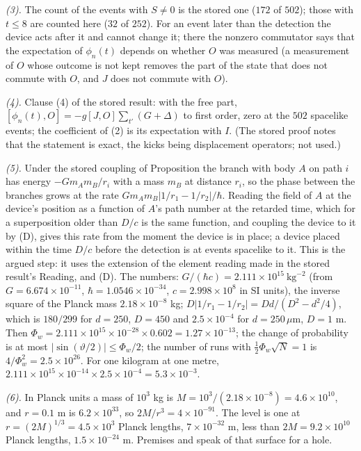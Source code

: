 \emph{(3).} The count of the events with $S \neq 0$ is the stored one ($172$ of $502$); those with $t \le 8$ are counted here ($32$ of $252$). For an event later than the detection the device acts after it and cannot change it; there the nonzero commutator says that the expectation of $\phi_{n}(t)$ depends on whether $O$ was measured (a measurement of $O$ whose outcome is not kept removes the part of the state that does not commute with $O$, and $J$ does not commute with $O$).

\emph{(4).} Clause (4) of the stored result: with the free part, $[\phi_{n}(t), O] = -g[J, O]\sum_{t'}(G + \Delta)$ to first order, zero at the $502$ spacelike events; the coefficient of (2) is its expectation with $I$. (The stored proof notes that the statement is exact, the kicks being displacement operators; not used.)

\emph{(5).} Under the stored coupling of Proposition  the branch with body $A$ on path $i$ has energy $-Gm_{A}m_{B}/r_{i}$ with a mass $m_{B}$ at distance $r_{i}$, so the phase between the branches grows at the rate $Gm_{A}m_{B}|1/r_{1} - 1/r_{2}|/\hbar$. Reading the field of $A$ at the device's position as a function of $A$'s path number at the retarded time, which for a superposition older than $D/c$ is the same function, and coupling the device to it by (D), gives this rate from the moment the device is in place; a device placed within the time $D/c$ before the detection is at events spacelike to it. This is the argued step: it uses the extension of the element reading made in the stored result's Reading, and (D). The numbers: $G/(\hbar c) = 2.111 \times 10^{15}\ \mathrm{kg}^{-2}$ (from $G = 6.674 \times 10^{-11}$, $\hbar = 1.0546 \times 10^{-34}$, $c = 2.998 \times 10^{8}$ in SI units), the inverse square of the Planck mass $2.18 \times 10^{-8}$ kg; $D|1/r_{1} - 1/r_{2}| = Dd/(D^{2} - d^{2}/4)$, which is $180/299$ for $d = 250$, $D = 450$ and $2.5 \times 10^{-4}$ for $d = 250\,\mu$m, $D = 1$ m. Then $\Phi_{w} = 2.111 \times 10^{15} \times 10^{-28} \times 0.602 = 1.27 \times 10^{-13}$; the change of probability is at most $|\sin(\vartheta/2)| \le \Phi_{w}/2$; the number of runs with $\tfrac12\Phi_{w}\sqrt{N} = 1$ is $4/\Phi_{w}^{2} = 2.5 \times 10^{26}$. For one kilogram at one metre, $2.111 \times 10^{15} \times 10^{-14} \times 2.5 \times 10^{-4} = 5.3 \times 10^{-3}$.

\emph{(6).} In Planck units a mass of $10^{3}$ kg is $M = 10^{3}/(2.18 \times 10^{-8}) = 4.6 \times 10^{10}$, and $r = 0.1$ m is $6.2 \times 10^{33}$, so $2M/r^{3} = 4 \times 10^{-91}$. The level is one at $r = (2M)^{1/3} = 4.5 \times 10^{3}$ Planck lengths, $7 \times 10^{-32}$ m, less than $2M = 9.2 \times 10^{10}$ Planck lengths, $1.5 \times 10^{-24}$ m. Premises  and  speak of that surface for a hole.

